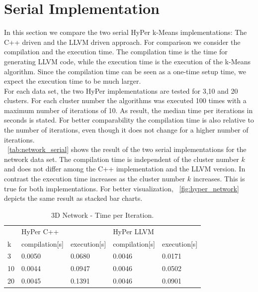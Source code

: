 \section{Serial Implementation}\label{section:serial}

In this section we compare the two serial HyPer k-Means implementations: The C++ driven and the LLVM driven approach. For comparison we consider the compilation and the execution time. The compilation time is the time for generating LLVM code, while the execution time is the execution of the k-Means algorithm. Since the compilation time can be seen as a one-time setup time, we expect the execution time to be much larger. 
\\
For each data set, the two HyPer implementations are tested for 3,10 and 20 clusters. For each cluster number the algorithms was executed 100 times with a maximum number of iterations of 10. As result, the median time per iterations in seconds is stated. For better comparability the compilation time is also relative to the number of iterations, even though it does not change for a higher number of iterations.
\\
~\autoref{tab:network_serial} shows the result of the two serial implementations for the network data set. The compilation time is independent of the cluster number $k$ and does not differ among the C++ implementation and the LLVM version. In contrast the execution time increases as the cluster number $k$ increases. This is true for both implementations. For better visualization, ~\autoref{fig:hyper_network} depicts the same result as stacked bar charts.

\begin{table}[htsb]
  \caption[3D Network - Time per Iteration]{3D Network - Time per Iteration.}\label{tab:network_serial}
  \centering
  \begin{tabular}{l l l l l}
    \toprule
      & HyPer C++ & & HyPer LLVM & \\
      k & compilation[s] & execution[s] & compilation[s] & execution[s] \\
    \midrule
      3 & 0.0050 & 0.0680 & 0.0046 & 0.0171 \\
      10 & 0.0044 & 0.0947 & 0.0046 & 0.0502 \\
      20 & 0.0045 & 0.1391 & 0.0046 & 0.0901 \\
    \bottomrule
  \end{tabular}
\end{table}



